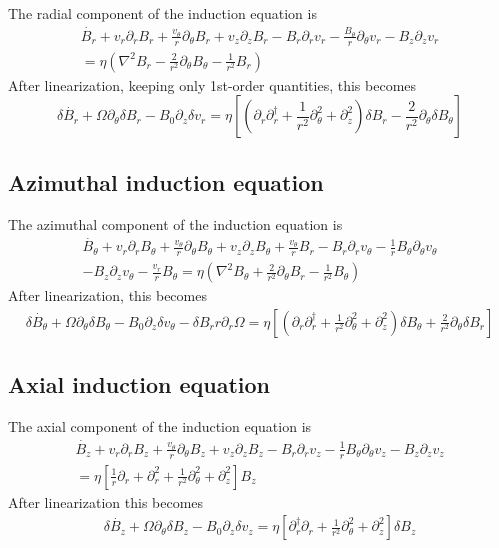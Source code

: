 \documentclass[letterpaper]{article}
\begin{document}
The radial component of the induction equation is
\begin{align}
\dot{B_r} + v_r \partial_r B_r + \frac{v_\theta}{r}\partial_\theta B_r
 + v_z \partial_z B_r - B_r \partial_r v_r
 -\frac{B_\theta}{r}\partial_\theta v_r - B_z \partial_z v_r
\nonumber \\
= \eta\left(\nabla^2 B_r -\frac{2}{r^2}\partial_\theta B_\theta
 - \frac{1}{r^2}B_r\right)
\end{align}
After linearization, keeping only 1st-order quantities, this becomes
\begin{equation}
\delta \dot{B_r} + \Omega \partial_\theta \delta B_r
 - B_0 \partial_z \delta v_r = \eta\left[\left(\partial_r \partial_r^\dagger
 + \frac{1}{r^2}\partial_\theta^2 + \partial_z^2\right)\delta B_r
 - \frac{2}{r^2}\partial_\theta \delta B_\theta\right]
\end{equation}

\subsection{Azimuthal induction equation}
The azimuthal component of the induction equation is
\begin{align}
\dot{B_\theta}+v_r \partial_r B_\theta
 + \frac{v_\theta}{r}\partial_\theta B_\theta + v_z \partial_z B_\theta
 + \frac{v_\theta}{r}B_r - B_r\partial_r v_\theta
 - \frac{1}{r}B_\theta \partial_\theta v_\theta
\nonumber \\
- B_z \partial_z v_\theta - \frac{v_r}{r}B_\theta
 = \eta\left(\nabla^2 B_\theta + \frac{2}{r^2}\partial_\theta B_r
 - \frac{1}{r^2}B_\theta \right)
\end{align}
After linearization, this becomes
\begin{align}
\delta \dot{B_\theta} + \Omega \partial_\theta \delta B_\theta
 - B_0 \partial_z \delta v_\theta - \delta B_r r \partial_r \Omega
 = \eta\left[\left(\partial_r \partial_r^\dagger
 + \frac{1}{r^2}\partial_\theta^2 + \partial_z^2\right)\delta B_\theta
 + \frac{2}{r^2}\partial_\theta \delta B_r\right]
\end{align}

\subsection{Axial induction equation}
The axial component of the induction equation is
\begin{align}
\dot{B_z} + v_r \partial_r B_z + \frac{v_\theta}{r}\partial_\theta B_z
 + v_z \partial_z B_z - B_r \partial_r v_z
 - \frac{1}{r}B_\theta \partial_\theta v_z - B_z \partial_z v_z
\nonumber \\
=\eta\left[\frac{1}{r}\partial_r + \partial_r^2
 + \frac{1}{r^2}\partial_\theta^2 + \partial_z^2\right]B_z
\end{align}
After linearization this becomes
\begin{align}
\delta\dot{B_z} + \Omega\partial_\theta \delta B_z - B_0\partial_z \delta v_z
 = \eta\left[\partial_r^\dagger \partial_r + \frac{1}{r^2}\partial_\theta^2
 + \partial_z^2\right]\delta B_z
\end{align}
\end{document}
